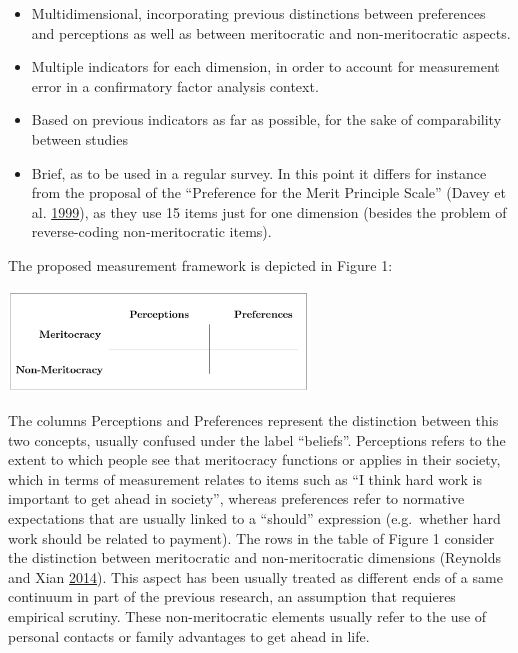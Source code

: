 \documentclass[
]{article}
\begin{document}
\begin{itemize}
\item
  Multidimensional, incorporating previous distinctions between
  preferences and perceptions as well as between meritocratic and
  non-meritocratic aspects.
\item
  Multiple indicators for each dimension, in order to account for
  measurement error in a confirmatory factor analysis context.
\item
  Based on previous indicators as far as possible, for the sake of
  comparability between studies
\item
  Brief, as to be used in a regular survey. In this point it differs for
  instance from the proposal of the ``Preference for the Merit Principle
  Scale'' (Davey et al.
  \protect\hyperlink{ref-davey_preference_1999}{1999}), as they use 15
  items just for one dimension (besides the problem of reverse-coding
  non-meritocratic items).
\end{itemize}

The proposed measurement framework is depicted in Figure 1:

\includegraphics[width=0.6\textwidth,height=\textheight]{../input/images/generalf.png}

The columns Perceptions and Preferences represent the distinction
between this two concepts, usually confused under the label ``beliefs''.
Perceptions refers to the extent to which people see that meritocracy
functions or applies in their society, which in terms of measurement
relates to items such as ``I think hard work is important to get ahead
in society'', whereas preferences refer to normative expectations that
are usually linked to a ``should'' expression (e.g.~whether hard work
should be related to payment). The rows in the table of Figure 1
consider the distinction between meritocratic and non-meritocratic
dimensions (Reynolds and Xian
\protect\hyperlink{ref-reynolds_perceptions_2014}{2014}). This aspect
has been usually treated as different ends of a same continuum in part
of the previous research, an assumption that requieres empirical
scrutiny. These non-meritocratic elements usually refer to the use of
personal contacts or family advantages to get ahead in life.
\end{document}
